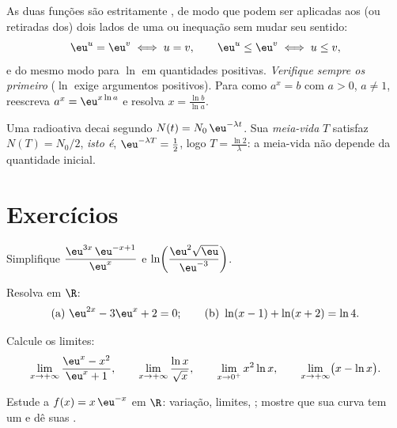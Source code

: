 \begin{method}\label{met:g12:exp:equations}
As duas funções são estritamente , de modo que podem ser
aplicadas aos (ou retiradas dos) dois lados de uma  ou inequação
sem mudar seu sentido:
\[
\eu^{u} = \eu^{v} \iff u = v, \qquad
\eu^{u} \leq \eu^{v} \iff u \leq v,
\]
e do mesmo modo para $\ln$ em quantidades positivas. \emph{Verifique
sempre os  primeiro} ($\ln$ exige argumentos positivos). Para
 como $a^x = b$ com $a>0$, $a \neq 1$, reescreva
$a^x = \eu^{x\ln a}$ e resolva $x = \frac{\ln b}{\ln a}$.
\end{method}

\begin{example}\label{ex:g12:exp:halflife}
Uma  radioativa decai segundo $N(t) = N_0\,\eu^{-\lambda t}$. Sua
\emph{meia-vida} $T$ satisfaz $N(T) = N_0/2$, \emph{isto é},
$\eu^{-\lambda T} = \frac12$, logo $T = \frac{\ln 2}{\lambda}$: a
meia-vida não depende da quantidade inicial.
\end{example}

\section{Exercícios}

\begin{exercise}[$\star$]\label{exo:g12:exp:1}
Simplifique $\dfrac{\eu^{3x}\,\eu^{-x+1}}{\eu^{x}}$ e
$\ln\!\left(\dfrac{\eu^2\sqrt{\eu}}{\eu^{-3}}\right)$.
\end{exercise}

\begin{exercise}[$\star$]\label{exo:g12:exp:2}
Resolva em $\R$:
\[
\text{(a) } \eu^{2x} - 3\eu^{x} + 2 = 0;
\qquad
\text{(b) } \ln(x - 1) + \ln(x + 2) = \ln 4 .
\]
\end{exercise}

\begin{exercise}[$\star$]\label{exo:g12:exp:3}
Calcule os limites:
\[
\lim_{x\to+\infty} \frac{\eu^x - x^2}{\eu^x + 1}, \qquad
\lim_{x\to+\infty} \frac{\ln x}{\sqrt x}, \qquad
\lim_{x\to0^+} x^2 \ln x, \qquad
\lim_{x\to+\infty} \bigl(x - \ln x\bigr).
\]
\end{exercise}

\begin{exercise}[$\star\star$]\label{exo:g12:exp:4}
Estude a  $f(x) = x\,\eu^{-x}$ em $\R$: variação, limites, ;
mostre que sua curva tem um  e dê suas .
\end{exercise}

